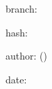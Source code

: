 \documentclass{scrartcl}
\begin{document}
  branch: \gitBranch{}

  hash: \gitHash{}

  author: \gitAuthorName{} (\gitAuthorEmail{})

  date: \gitAuthorIsoDate{}
\end{document}
